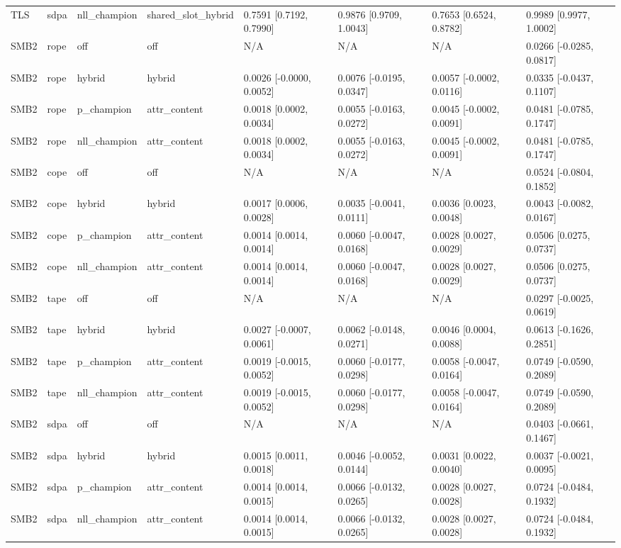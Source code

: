 \begin{tabular}{llllllll}
TLS & sdpa & nll\_champion & shared\_slot\_hybrid & 0.7591 [0.7192, 0.7990] & 0.9876 [0.9709, 1.0043] & 0.7653 [0.6524, 0.8782] & 0.9989 [0.9977, 1.0002] \\
SMB2 & rope & off & off & N/A & N/A & N/A & 0.0266 [-0.0285, 0.0817] \\
SMB2 & rope & hybrid & hybrid & 0.0026 [-0.0000, 0.0052] & 0.0076 [-0.0195, 0.0347] & 0.0057 [-0.0002, 0.0116] & 0.0335 [-0.0437, 0.1107] \\
SMB2 & rope & p\_champion & attr\_content & 0.0018 [0.0002, 0.0034] & 0.0055 [-0.0163, 0.0272] & 0.0045 [-0.0002, 0.0091] & 0.0481 [-0.0785, 0.1747] \\
SMB2 & rope & nll\_champion & attr\_content & 0.0018 [0.0002, 0.0034] & 0.0055 [-0.0163, 0.0272] & 0.0045 [-0.0002, 0.0091] & 0.0481 [-0.0785, 0.1747] \\
SMB2 & cope & off & off & N/A & N/A & N/A & 0.0524 [-0.0804, 0.1852] \\
SMB2 & cope & hybrid & hybrid & 0.0017 [0.0006, 0.0028] & 0.0035 [-0.0041, 0.0111] & 0.0036 [0.0023, 0.0048] & 0.0043 [-0.0082, 0.0167] \\
SMB2 & cope & p\_champion & attr\_content & 0.0014 [0.0014, 0.0014] & 0.0060 [-0.0047, 0.0168] & 0.0028 [0.0027, 0.0029] & 0.0506 [0.0275, 0.0737] \\
SMB2 & cope & nll\_champion & attr\_content & 0.0014 [0.0014, 0.0014] & 0.0060 [-0.0047, 0.0168] & 0.0028 [0.0027, 0.0029] & 0.0506 [0.0275, 0.0737] \\
SMB2 & tape & off & off & N/A & N/A & N/A & 0.0297 [-0.0025, 0.0619] \\
SMB2 & tape & hybrid & hybrid & 0.0027 [-0.0007, 0.0061] & 0.0062 [-0.0148, 0.0271] & 0.0046 [0.0004, 0.0088] & 0.0613 [-0.1626, 0.2851] \\
SMB2 & tape & p\_champion & attr\_content & 0.0019 [-0.0015, 0.0052] & 0.0060 [-0.0177, 0.0298] & 0.0058 [-0.0047, 0.0164] & 0.0749 [-0.0590, 0.2089] \\
SMB2 & tape & nll\_champion & attr\_content & 0.0019 [-0.0015, 0.0052] & 0.0060 [-0.0177, 0.0298] & 0.0058 [-0.0047, 0.0164] & 0.0749 [-0.0590, 0.2089] \\
SMB2 & sdpa & off & off & N/A & N/A & N/A & 0.0403 [-0.0661, 0.1467] \\
SMB2 & sdpa & hybrid & hybrid & 0.0015 [0.0011, 0.0018] & 0.0046 [-0.0052, 0.0144] & 0.0031 [0.0022, 0.0040] & 0.0037 [-0.0021, 0.0095] \\
SMB2 & sdpa & p\_champion & attr\_content & 0.0014 [0.0014, 0.0015] & 0.0066 [-0.0132, 0.0265] & 0.0028 [0.0027, 0.0028] & 0.0724 [-0.0484, 0.1932] \\
SMB2 & sdpa & nll\_champion & attr\_content & 0.0014 [0.0014, 0.0015] & 0.0066 [-0.0132, 0.0265] & 0.0028 [0.0027, 0.0028] & 0.0724 [-0.0484, 0.1932] \\
\hline
\end{tabular}
